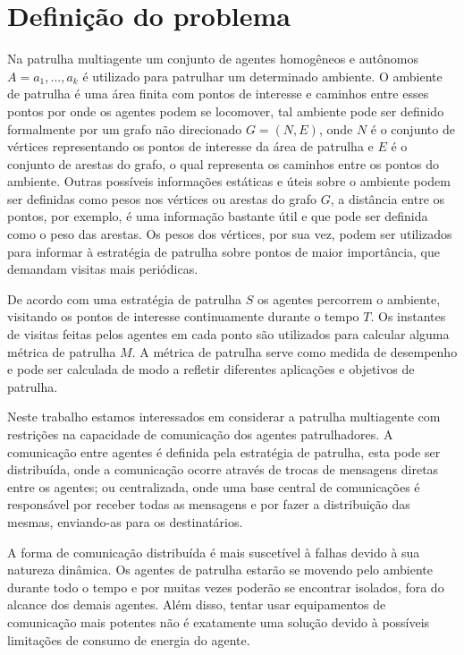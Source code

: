 \chapter{Definição do problema}
\label{chp:problem}

Na patrulha multiagente um conjunto de agentes homogêneos e autônomos $A = 
{a_{1}, ..., a_{k}}$ é 
utilizado para patrulhar um determinado ambiente. O ambiente de patrulha é uma 
área finita com pontos de interesse e caminhos entre esses pontos por onde os 
agentes podem se locomover, tal ambiente pode ser definido formalmente por um 
grafo não direcionado $G = (N, E)$, onde $N$ é o conjunto de vértices 
representando os pontos de interesse da área de patrulha e $E$ é o conjunto de 
arestas do grafo, o qual representa os caminhos entre os pontos do ambiente. 
Outras possíveis informações estáticas e úteis sobre o ambiente podem ser 
definidas como pesos nos vértices ou arestas do grafo $G$, a distância entre os 
pontos, por exemplo, é uma informação bastante útil e que pode ser definida como 
o peso das arestas. Os pesos dos vértices, por sua vez, podem ser utilizados 
para informar à estratégia de patrulha sobre pontos de maior importância, que 
demandam visitas mais periódicas. 

De acordo com uma estratégia de patrulha $S$ os agentes percorrem o ambiente, 
visitando os pontos de interesse continuamente durante o tempo $T$. Os instantes 
de visitas feitas pelos agentes em cada ponto são utilizados para calcular 
alguma métrica de patrulha $M$. A métrica de patrulha serve como medida de 
desempenho e pode ser calculada de modo a refletir diferentes aplicações e 
objetivos de patrulha.

Neste trabalho estamos interessados em considerar a patrulha multiagente com 
restrições na capacidade de comunicação dos agentes patrulhadores. A comunicação 
entre agentes é definida pela estratégia de patrulha, esta pode ser distribuída, 
onde a comunicação ocorre através de trocas de mensagens diretas entre os 
agentes; ou centralizada, onde uma base central de comunicações é responsável 
por receber todas as mensagens e por fazer a distribuição das mesmas, 
enviando-as para os destinatários. 

A forma de comunicação distribuída é mais suscetível à falhas devido à sua 
natureza dinâmica. Os agentes de patrulha estarão se movendo pelo ambiente 
durante todo o tempo e por muitas vezes poderão se encontrar isolados, fora do 
alcance dos demais agentes. Além disso, tentar usar equipamentos de comunicação 
mais potentes não é exatamente uma solução devido à possíveis limitações de 
consumo de energia do agente. 

